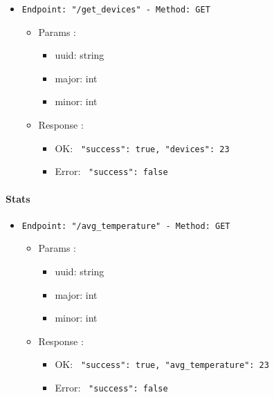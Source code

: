 \begin{itemize}
  \item \texttt{Endpoint: "/get_devices" -  Method: GET}
  \begin{itemize} 
    \item Params :
    \begin{itemize}
      \item uuid: string
      \item major: int
      \item minor: int
    \end{itemize}

    \item Response : 
    \begin{itemize}
      \item OK: \texttt{{ "success": true, "devices": 23 }}
      \item Error: \texttt{{ "success": false }}
    \end{itemize}
  \end{itemize}
\end{itemize}

\paragraph{Stats}

\begin{itemize}
  \item \texttt{Endpoint: "/avg_temperature" -  Method: GET}
  \begin{itemize} 
    \item Params :
    \begin{itemize}
      \item uuid: string
      \item major: int
      \item minor: int
    \end{itemize}

    \item Response : 
    \begin{itemize}
      \item OK: \texttt{{ "success": true, "avg_temperature": 23 }}
      \item Error: \texttt{{ "success": false }}
    \end{itemize}
  \end{itemize}
\end{itemize}

